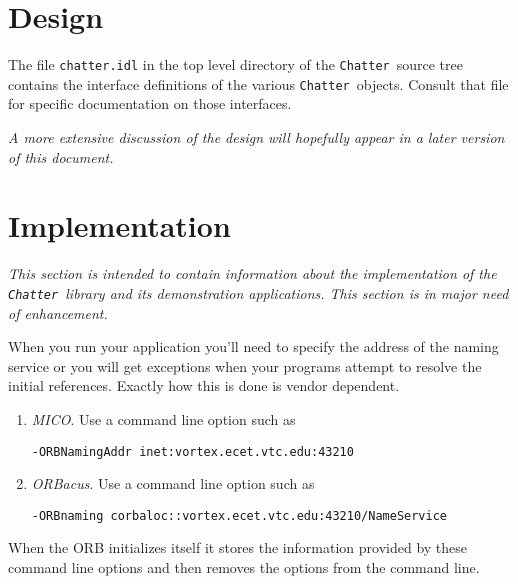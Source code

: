 \documentclass{article}
\newcommand{\Chatter}{\texttt{Chatter}}
\begin{document}
\section{Design}

The file \texttt{chatter.idl} in the top level directory of the \Chatter\ source tree contains the interface definitions of the various \Chatter\ objects. Consult that file for specific documentation on those interfaces.

\textit{A more extensive discussion of the design will hopefully appear in a later version of this document.}

\section{Implementation}

\textit{This section is intended to contain information about the implementation of the \Chatter\ library and its demonstration applications. This section is in major need of enhancement.}

When you run your application you'll need to specify the address of the naming service or you will get exceptions when your programs attempt to resolve the initial references. Exactly how this is done is vendor dependent.

\begin{enumerate}
\item \emph{MICO}. Use a command line option such as

\centerline{\texttt{-ORBNamingAddr inet:vortex.ecet.vtc.edu:43210}}

\item \emph{ORBacus}. Use a command line option such as

\centerline{\texttt{-ORBnaming
    corbaloc::vortex.ecet.vtc.edu:43210/NameService}}

\end{enumerate}

When the ORB initializes itself it stores the information provided by these command line options and then removes the options from the command line.
\end{document}
